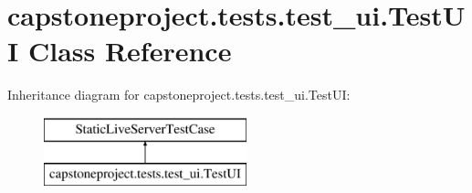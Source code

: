\hypertarget{classcapstoneproject_1_1tests_1_1test__ui_1_1_test_u_i}{}\section{capstoneproject.\+tests.\+test\+\_\+ui.\+Test\+UI Class Reference}
\label{classcapstoneproject_1_1tests_1_1test__ui_1_1_test_u_i}
Inheritance diagram for capstoneproject.\+tests.\+test\+\_\+ui.\+Test\+UI\+:\begin{figure}[H]
\begin{center}
\leavevmode
\includegraphics[height=2.000000cm]{classcapstoneproject_1_1tests_1_1test__ui_1_1_test_u_i}
\end{center}
\end{figure}
